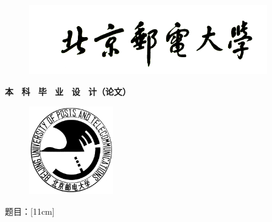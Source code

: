 \documentclass[../main.tex]{subfiles}
\begin{document}
\begin{titlepage}

    \pagestyle{empty}
    \centering

    \begin{figure}[H]
        \centering
        \includegraphics[width=10.34cm]{assets/bupt-name.png}
    \end{figure}

    \vspace{1cm}

    \begin{spacing}{1.05}
        {
            \heiti
            \textbf{
                本~
                科~
                毕~
                业~
                设~
                计（论文）
            } \\
        }
    \end{spacing}

    \vspace{1.5cm}

    \begin{figure}[H]
        \centering
        \includegraphics[width=3.66cm]{assets/bupt-badge.jpg}
    \end{figure}

    \vspace{1cm}

    \begin{spacing}{1.05}
        \heiti\bfseries

        题目：\ul[11cm]{\thesistitle }
    \end{spacing}


\end{titlepage}
\end{document}
